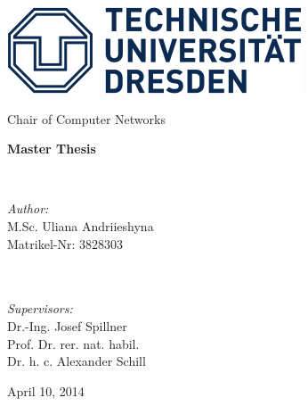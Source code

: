 \begin{titlepage}

\begin{center}

\begin{minipage}{0.30\textwidth}
	\begin{flushleft}
			\includegraphics[scale=0.45]{images/tud_logo}
	\end{flushleft}
\end{minipage}

\begin{bfseries}
	\large Chair of Computer Networks
\end{bfseries}

\vspace*{75mm}

{\LARGE \bf Master Thesis}\\[1 cm]

\begin{minipage}{0.8\textwidth}
	\begin{center}

		\\[3cm]
	\end{center}
\end{minipage}

\vspace{30mm}

\begin{minipage}{0.35\textwidth}
	\begin{flushleft} \large
		\emph{Author:}\\
		M.Sc. Uliana Andriieshyna\\
		Matrikel-Nr: 3828303\\
		~\\ ~\\
	\end{flushleft}
\end{minipage}
\begin{minipage}{0.60\textwidth}
	\begin{flushright} \large
		\emph{Supervisors:} \\
		Dr.-Ing. Josef Spillner\\
		Prof. Dr. rer. nat. habil.\\ Dr. h. c. Alexander Schill\\
		\end{flushright}
\end{minipage}

\vfill

April 10, 2014

\end{center}
\end{titlepage}
